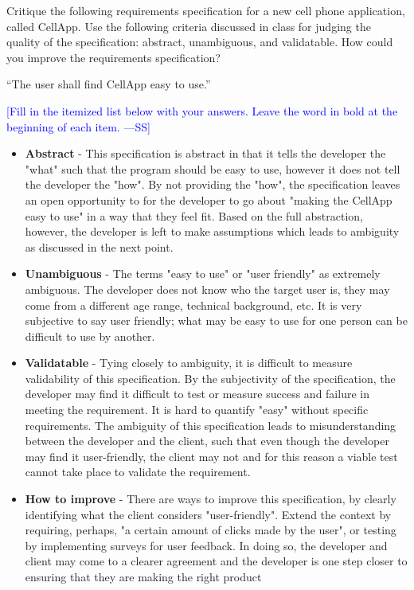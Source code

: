 \documentclass[12pt,fleqn]{examtst}
\newcommand{\authornote}[3]{\textcolor{#1}{[#3 ---#2]}}
\newcommand{\authornote}[3]{}
\newcommand{\wss}[1]{\authornote{blue}{SS}{#1}}
\begin{document}
\newpage

 Critique the following requirements specification
for a new cell phone application, called CellApp.  Use the following criteria
discussed in class for judging the quality of the specification: abstract,
unambiguous, and validatable.  How could you improve the requirements
specification?

\bigskip

``The user shall find CellApp easy to use.''

\bigskip

\noindent \wss{Fill in the itemized list below with your answers.  Leave the
  word in bold at the beginning of each item.}

\begin{itemize}
\item \textbf{Abstract} - This specification is abstract in that it tells the developer the "what" such that the program should be easy to use, however it does not tell the developer the "how". By not providing the "how", the specification leaves an open opportunity to for the developer to go about "making the CellApp easy to use" in a way that they feel fit. Based on the full abstraction, however, the developer is left to make assumptions which leads to ambiguity as discussed in the next point. 
\item \textbf{Unambiguous} - The terms "easy to use" or "user friendly" as extremely ambiguous. The developer does not know who the target user is, they may come from a different age range, technical background, etc. It is very subjective to say user friendly; what may be easy to use for one person can be difficult to use by another. 
\item \textbf{Validatable} - Tying closely to ambiguity, it is difficult to measure validability of this specification. By the subjectivity of the specification, the developer may find it difficult to test or measure success and failure in meeting the requirement. It is hard to quantify "easy" without specific requirements. The ambiguity of this specification leads to misunderstanding between the developer and the client, such that even though the developer may find it user-friendly, the client may not and for this reason a viable test cannot take place to validate the requirement. 
\item \textbf{How to improve} - There are ways to improve this specification, by clearly identifying what the client considers "user-friendly". Extend the context by requiring, perhaps, "a certain amount of clicks made by the user", or testing by implementing surveys for user feedback. In doing so, the developer and client may come to a clearer agreement and the developer is one step closer to ensuring that they are making the right product
\end{itemize}
\end{document}
